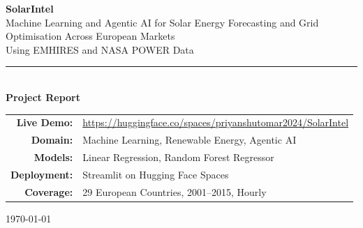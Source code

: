 \documentclass[12pt, a4paper]{article}
\begin{document}
\begin{titlepage}
    \centering
    \vspace*{1.5cm}

    {\huge\bfseries\color{solarblue} SolarIntel}\\[0.6cm]
    {\Large\color{solaramber} Machine Learning and Agentic AI for Solar Energy Forecasting and Grid Optimisation Across European Markets}\\[0.3cm]
    {\large Using EMHIRES and NASA POWER Data}\\[0.4cm]
    \rule{\linewidth}{1.5pt}\\[0.8cm]

    {\large\textbf{Project Report}}

    \vspace{1.5cm}

    \begin{tabular}{rl}
        \textbf{Live Demo:} & \url{https://huggingface.co/spaces/priyanshutomar2024/SolarIntel} \\[4pt]
        \textbf{Domain:} & Machine Learning, Renewable Energy, Agentic AI \\[4pt]
        \textbf{Models:} & Linear Regression, Random Forest Regressor \\[4pt]
        \textbf{Deployment:} & Streamlit on Hugging Face Spaces \\[4pt]
        \textbf{Coverage:} & 29 European Countries, 2001--2015, Hourly \\
    \end{tabular}

    \vspace{2cm}

    \vfill
    {\large \today}
\end{titlepage}


\newpage
{\singlespacing
\tableofcontents
}
\newpage
\end{document}
